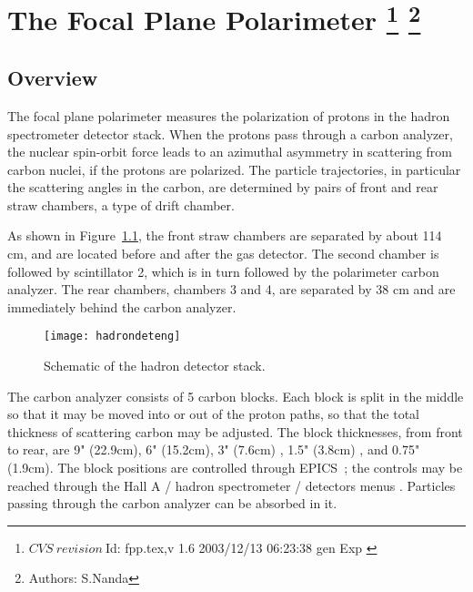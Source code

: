 \chapter[The Focal Plane Polarimeter]{The Focal Plane Polarimeter
\footnote{
  $CVS~revision~ $Id: fpp.tex,v 1.6 2003/12/13 06:23:38 gen Exp $ $
}
\footnote{Authors: S.Nanda }
}

\section{Overview}

The focal plane polarimeter measures the polarization of protons in the
hadron spectrometer detector stack.
When the protons pass through a carbon analyzer, the nuclear spin-orbit
force leads to an azimuthal asymmetry in scattering from carbon nuclei,
if the protons are polarized. 
The particle trajectories, in particular the
scattering angles in the carbon, are determined by pairs of front and rear
straw chambers, a type of drift chamber.

As shown in Figure~\ref{fig:hadron_det}, 
the front straw chambers are separated by about 114 cm, and are located
before and after the gas \Cherenkov{} detector.
The second chamber is followed by scintillator 2, which is in turn
followed by the polarimeter carbon analyzer.
The rear chambers, chambers 3 and 4, are separated by 38 cm and are
immediately behind the carbon analyzer.

\begin{figure}[bth]
\begin{center}
\texttt{[image: hadrondeteng]}
{\linespread{1.}
\caption[Detectors: Hadron Arm detector]{Schematic of the hadron detector stack.}
\label{fig:hadron_det}}
\end{center}
\end{figure}

The carbon analyzer consists of 5 carbon blocks.
Each block is split in the middle so that it may be moved into or out
of the proton paths, so that the total thickness of scattering carbon may be
adjusted.
The block thicknesses, from front to rear, are 9" (22.9cm), 6" (15.2cm), 
3" (7.6cm) , 1.5" (3.8cm) , and 0.75" (1.9cm).
The block positions are controlled through EPICS~\cite{EPICSwww}; the controls
may be reached through the Hall A / hadron spectrometer / detectors menus%
.
Particles passing through the carbon analyzer can be absorbed in it.

